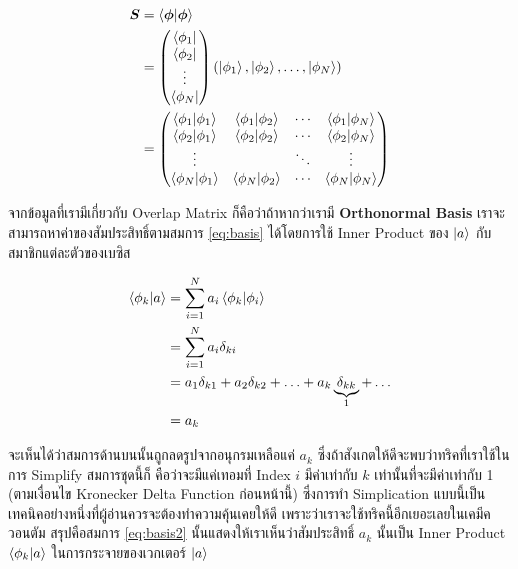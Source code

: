 \begin{align}
  \bm{S}
   & =
  \braket{\boldsymbol \phi}{\boldsymbol \phi }       \\
   & =
  \begin{pmatrix}
    \bra{\phi_1} \\
    \bra{\phi_2} \\
    \vdots       \\
    \bra{\phi_N}
  \end{pmatrix}
  (\ket{\phi_1}, \ket{\phi_2}, \ldots, \ket{\phi_N}) \\
   & =
  \begin{pmatrix}
    \braket{\phi_1}{\phi_1} & \braket{\phi_1}{\phi_2} & \cdots & \braket{\phi_1}{\phi_N} \\
    \braket{\phi_2}{\phi_1} & \braket{\phi_2}{\phi_2} & \cdots & \braket{\phi_2}{\phi_N} \\
    \vdots                  &                         & \ddots & \vdots                  \\
    \braket{\phi_N}{\phi_1} & \braket{\phi_N}{\phi_2} & \cdots & \braket{\phi_N}{\phi_N}
  \end{pmatrix}
\end{align}

จากข้อมูลที่เรามีเกี่ยวกับ Overlap Matrix ก็คือว่าถ้าหากว่าเรามี \textbf{Orthonormal Basis} เราจะสามารถหาค่าของสัมประสิทธิ์ตามสมการ
\eqref{eq:basis} ได้โดยการใช้ Inner Product ของ $\ket{a}$ กับสมาชิกแต่ละตัวของเบซิส

\begin{align}
  \label{eq:basis2}
  \braket{\phi_k}{a}
   & =
  \sum_{i = 1}^N a_i \braket{\phi_k}{\phi_i}                                             \\
   & =
  \sum_{i = 1}^N a_i \delta_{ki}                                                         \\
   & =
  a_1 \delta_{k1} + a_2 \delta_{k2} + \ldots + a_k \underbrace{\delta_{kk}}_{1} + \ldots \\
   & = a_k
\end{align}

\noindent จะเห็นได้ว่าสมการด้านบนนั้นถูกลดรูปจากอนุกรมเหลือแค่ $a_k$ ซึ่งถ้าสังเกตให้ดีจะพบว่าทริคที่เราใช้ในการ Simplify สมการชุดนี้ก็%
คือว่าจะมีแค่เทอมที่ Index $i$ มีค่าเท่ากับ $k$ เท่านั้นที่จะมีค่าเท่ากับ 1 (ตามเงื่อนไข Kronecker Delta Function ก่อนหน้านี้) ซึ่งการทำ
Simplication แบบนี้เป็นเทคนิคอย่างหนึ่งที่ผู้อ่านควรจะต้องทำความคุ้นเคยให้ดี เพราะว่าเราจะใช้ทริคนี้อีกเยอะเลยในเคมีควอนตัม
สรุปคือสมการ \eqref{eq:basis2} นั้นแสดงให้เราเห็นว่าสัมประสิทธิ์ $a_k$ นั้นเป็น Inner Product $\braket{\phi_k}{a}$
ในการกระจายของเวกเตอร์ $\ket{a}$


